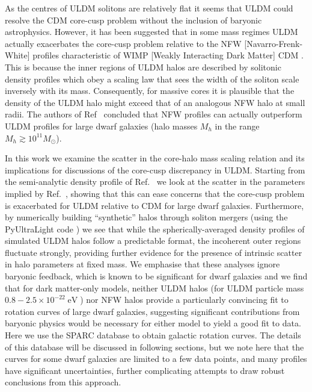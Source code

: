 \documentclass[a4paper,11pt]{article}
\begin{document}
As the  centres of ULDM solitons are relatively flat it seems that ULDM could  resolve the CDM core-cusp problem without the inclusion of baryonic astrophysics. However, it has  been suggested that in some mass regimes ULDM actually exacerbates the core-cusp problem relative to the NFW [Navarro-Frenk-White] profiles  \cite{Navarro:1995iw} characteristic of WIMP [Weakly Interacting Dark Matter] CDM \cite{Robles:2018fur}. This is because the inner regions of ULDM halos are described by solitonic density profiles which obey a scaling law that sees the width of the soliton scale inversely with its mass. Consequently, for massive cores it is plausible that the density of the ULDM halo might exceed that of an analogous NFW halo at small radii. The authors of Ref~\cite{Robles:2018fur} concluded that NFW profiles can actually outperform ULDM profiles for large dwarf galaxies (halo masses $M_h$ in the range $M_h \gtrsim 10^{11} M_{\odot}$).  

In this work we examine the scatter in the core-halo mass scaling relation and its implications for discussions of the core-cusp discrepancy in ULDM. Starting from the semi-analytic density profile of Ref.~\cite{Robles:2018fur} we look at the scatter in the parameters implied by Ref.~\cite{Schive:2014hza}, showing that this can ease concerns that the core-cusp problem is  exacerbated for ULDM relative to CDM for large dwarf galaxies. Furthermore, by numerically building ``synthetic'' halos through soliton mergers (using the {\sc PyUltraLight} code \cite{Edwards:2018ccc}) we see that while the spherically-averaged density profiles of simulated ULDM halos follow a predictable format, the incoherent outer regions fluctuate strongly, providing further evidence for the presence of intrinsic scatter in halo parameters at fixed mass. We emphasise that these analyses ignore baryonic feedback, which is known to be significant for dwarf galaxies \cite{2018MNRAS.473.5698D, Benitez-Llambay:2018} and we find that for dark matter-only models, neither ULDM halos (for ULDM particle mass $0.8-2.5\times 10^{-22} \operatorname{eV}$)
nor NFW halos provide a particularly convincing fit to rotation curves of large dwarf galaxies, suggesting significant contributions from baryonic physics would be necessary for either model to yield a good fit to data. Here we use the SPARC database \cite{Lelli:2016zqa} to obtain galactic rotation curves. The details of this database will be discussed in following sections, but we note here that the curves for some dwarf galaxies are limited to a few data points, and many profiles have significant uncertainties, further complicating attempts to draw robust conclusions from this approach. 
\end{document}
